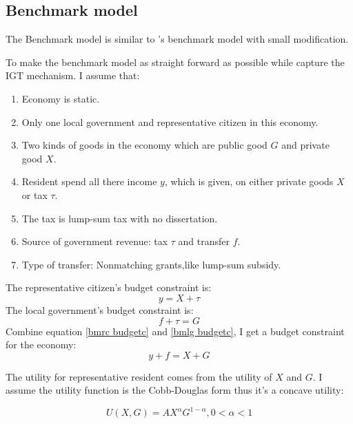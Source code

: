 \subsection{Benchmark model}

The Benchmark model is similar to \Textcite{vegh2016unsticking}'s benchmark model with small modification.

To make the benchmark model as straight forward as possible while capture the IGT mechanism. I assume that:

\begin{enumerate}
    \item Economy is static.
    \item Only one local government and representative citizen in this economy.
    \item Two kinds of goods in the economy which are public good $G$ \label{G} and private good $X$.\label{X}
    \item Resident spend all there income $y$, which is given, on either private goods $X$ or tax $\tau$.\label{y}
    \item The tax is lump-sum tax with no dissertation.
    \item Source of government revenue: tax $\tau$ and transfer $f$.\label{f}
    \item Type of transfer: Nonmatching grants,like lump-sum subsidy.
\end{enumerate}

The representative citizen's budget constraint is:
\begin{equation}
    y=X+\tau \label{bmrc budgetc}
\end{equation}
The local government's budget constraint is:
\begin{equation}
    f+\tau=G \label{bmlg budgetc}
\end{equation}
Combine equation \ref{bmrc budgetc} and \ref{bmlg budgetc}, I get a budget constraint for the economy:
\begin{equation}
    y+f=X+G \label{bmecoconstrain}
\end{equation}

The utility for representative resident comes from the utility of $X$ and $G$. I assume the utility function is the Cobb-Douglas form thus it's a concave utility:

\begin{equation}
    U(X,G)=AX^{\alpha}G^{1-\alpha} , 0<\alpha<1 \label{bmrcutility}
\end{equation}

